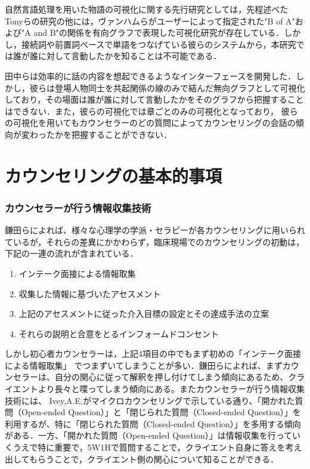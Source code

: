 \documentclass[shuuron]{kuee}
\begin{document}
自然言語処理を用いた物語の可視化に関する先行研究としては，先程述べたTonyら\cite{bergstrom2007seeing}の研究の他には，ヴァンハムら\cite{van2009mapping}がユーザーによって指定された"B of A"および"A and B"の関係を有向グラフで表現した可視化研究が存在している．しかし，接続詞や前置詞ベースで単語をつなげている彼らのシステムから，本研究では誰が誰に対して言動したかを知ることは不可能である．

田中ら\cite{tanaka}は効率的に話の内容を想起できるようなインターフェースを開発した．しかし，彼らは登場人物同士を共起関係の線のみで結んだ無向グラフとして可視化しており，その場面は誰が誰に対して言動したかをそのグラフから把握することはできない．また，彼らの可視化では章ごとのみの可視化となっており， 彼らの可視化を用いてもカウンセラーのどの質問によってカウンセリングの会話の傾向が変わったかを把握することができない．



\section{カウンセリングの基本的事項}

\subsubsection{カウンセラーが行う情報収集技術}

鎌田ら\cite{Darshana}によれば、様々な心理学の学派・セラピーが各カウンセリングに用いられているが，それらの差異にかかわらず，臨床現場でのカウンセリングの初動は，下記の一連の流れが含まれている．

\begin{enumerate}
  \item インテーク面接による情報取集
  \item 収集した情報に基づいたアセスメント
  \item 上記のアセスメントに従った介入目標の設定とその達成手法の立案
  \item それらの説明と合意をとるインフォームドコンセント
\end{enumerate}
しかし初心者カウンセラーは，上記4項目の中でもまず初めの「インテーク面接による情報取集」
でつまずいてしまうことが多い．鎌田らによれば、まずカウンセラーは、自分の関心に従って解釈を押し付けてしまう傾向にあるため、クライエントより長々と喋ってしまう傾向にある。またカウンセラーが行う情報収集技術には、
Ivey,A.E.\cite{ivey}がマイクロカウンセリングで示している通り、「開かれた質問（Open-ended Question）」と「閉じられた質問（Closed-ended Question）」を利用するが、特に「閉じられた質問（Closed-ended Question）」を多用する傾向がある．一方、「開かれた質問（Open-ended Question）」は情報収集を行っていくうえで特に重要で，5W1Hで質問することで，クライエント自身に答えを考え出してもらうことで，クライエント側の関心について知ることができる．
\end{document}
